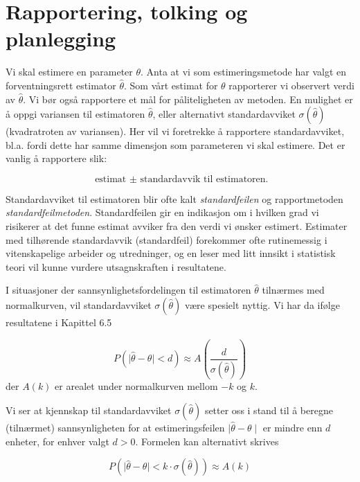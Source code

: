 \section{Rapportering, tolking og planlegging}
Vi skal estimere en parameter $\theta$. Anta at vi som
estimeringsmetode har valgt en forventningsrett estimator $\hat{\theta}$.
Som vårt estimat for $\theta$ rapporterer vi observert verdi av
$\hat{\theta}$. Vi bør også rapportere et mål for påliteligheten
 av metoden. En mulighet er å oppgi variansen til estimatoren
 $\hat{\theta}$, eller alternativt standardavviket
 $\sigma (\hat{\theta})$
(kvadratroten av variansen). Her vil vi foretrekke å rapportere
standardavviket, bl.a. fordi dette har samme dimensjon som
parameteren vi skal estimere. Det er vanlig å rapportere slik:

\[    \mbox{\ \ estimat $\pm $ standardavvik til estimatoren.} \]

\noindent Standardavviket til estimatoren blir ofte kalt {\em standardfeilen}
 og rapportmetoden {\em standardfeilmetoden}.
Standardfeilen gir en indikasjon om i hvilken grad vi risikerer
at det funne estimat avviker fra den verdi vi ønsker esti\-mert.
Estimater med tilhørende standardavvik (standardfeil) forekommer ofte
rutinemessig i vitenskapelige arbeider og utredninger, og en
leser med litt innsikt i statistisk teori vil kunne vurdere
utsagnskraften i resultatene.

I situasjoner der sannsynlighetsfordelingen til estimatoren
  $\hat{\theta} $ tilnær\-mes med normalkurven, vil standardavviket 
$\sigma( \hat{\theta} )$ være spesielt nyttig. Vi har da ifølge
 resultatene i Kapittel 6.5

\[ P(\mid \hat{\theta} - \theta \mid < d) \approx
                                 A(\frac{d}{\sigma(\hat{\theta})}) \]
der $A(k)$ er arealet under normalkurven mellom $-k$ og $k$.

Vi ser at kjennskap til standardavviket $\sigma (\hat{\theta})$
setter oss i stand til å beregne (tilnærmet) sannsynligheten for at
estimeringsfeilen $\mid \hat{\theta} - \theta \mid$ er mindre enn $d$
enheter, for enhver valgt $d>0$. Formelen kan alternativt skrives

\[ P(\mid \hat{\theta} - \theta \mid < k \cdot \sigma (\hat{\theta}))
                                                             \approx A(k) \]

